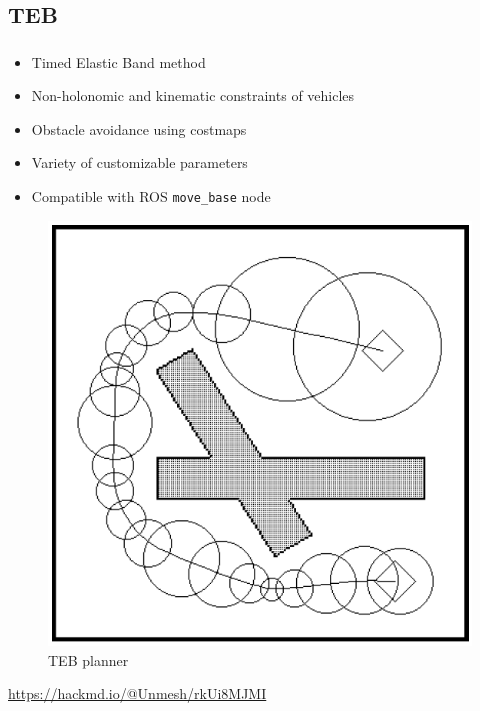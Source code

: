 \documentclass[numberofslides]{AMSBeamer}
\begin{document}
\subsection{TEB}
\begin{frame}[label=teb]
	\frametitle{\insertsectionhead}%
     \begin{minipage}{0.7\textwidth}
        \textbf{\insertsubsectionhead}
        \begin{itemize}
          \item Timed Elastic Band method
          \item Non-holonomic and kinematic constraints of vehicles
          \item Obstacle avoidance using costmaps
          \item Variety of customizable parameters
          \item Compatible with ROS \texttt{move\_base} node
        \end{itemize}
    \end{minipage}%
    \begin{minipage}{0.3\textwidth}
        \vspace{1cm}
        \begin{center}
            \begin{figure}
                \includegraphics[width=1\linewidth]{Presentations/LaTeX/images/teb.png}
                \caption{TEB planner}
                \label{fig:teb}
            \end{figure}
            \tiny{\url{https://hackmd.io/@Unmesh/rkUi8MJMI}}
        \end{center}
    \end{minipage}
\end{frame}
\end{document}
